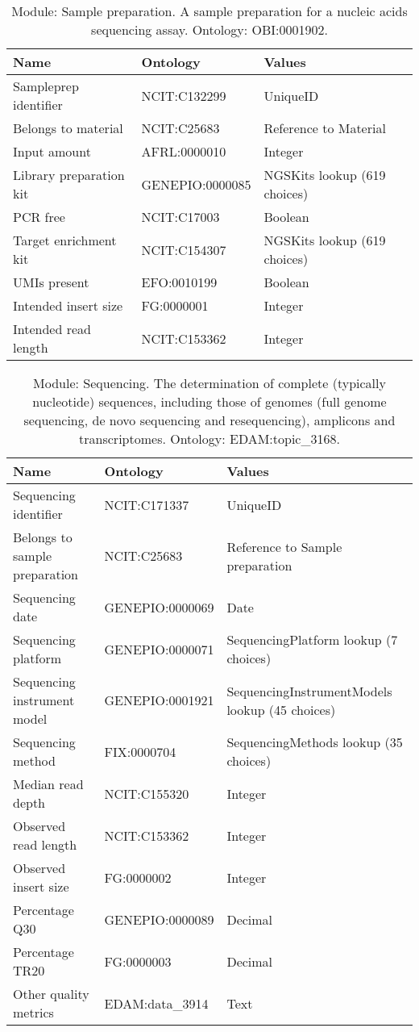 \documentclass{article}
\begin{document}
\begin{table}[htb]
\begin{tabular}{lll}
Name & Ontology & Values \\
\hline
Sampleprep identifier & NCIT:C132299 & UniqueID \\
Belongs to material & NCIT:C25683 & Reference to Material \\
Input amount & AFRL:0000010 & Integer \\
Library preparation kit & GENEPIO:0000085 & NGSKits lookup (619 choices) \\
PCR free & NCIT:C17003 & Boolean \\
Target enrichment kit & NCIT:C154307 & NGSKits lookup (619 choices) \\
UMIs present & EFO:0010199 & Boolean \\
Intended insert size & FG:0000001 & Integer \\
Intended read length & NCIT:C153362 & Integer \\
\hline
\end{tabular}
\caption[Module: Sample preparation]{\label{table:table8} Module: Sample preparation. A sample preparation for a nucleic acids sequencing assay. Ontology: OBI:0001902. }
\end{table}

\begin{table}[htb]
\begin{tabular}{lll}
Name & Ontology & Values \\
\hline
Sequencing identifier & NCIT:C171337 & UniqueID \\
Belongs to sample preparation & NCIT:C25683 & Reference to Sample preparation \\
Sequencing date & GENEPIO:0000069 & Date \\
Sequencing platform & GENEPIO:0000071 & SequencingPlatform lookup (7 choices) \\
Sequencing instrument model & GENEPIO:0001921 & SequencingInstrumentModels lookup (45 choices) \\
Sequencing method & FIX:0000704 & SequencingMethods lookup (35 choices) \\
Median read depth & NCIT:C155320 & Integer \\
Observed read length & NCIT:C153362 & Integer \\
Observed insert size & FG:0000002 & Integer \\
Percentage Q30 & GENEPIO:0000089 & Decimal \\
Percentage TR20 & FG:0000003 & Decimal \\
Other quality metrics & EDAM:data\_3914 & Text \\
\hline
\end{tabular}
\caption[Module: Sequencing]{\label{table:table9} Module: Sequencing. The determination of complete (typically nucleotide) sequences, including those of genomes (full genome sequencing, de novo sequencing and resequencing), amplicons and transcriptomes. Ontology: EDAM:topic\_3168. }
\end{table}
\end{document}
